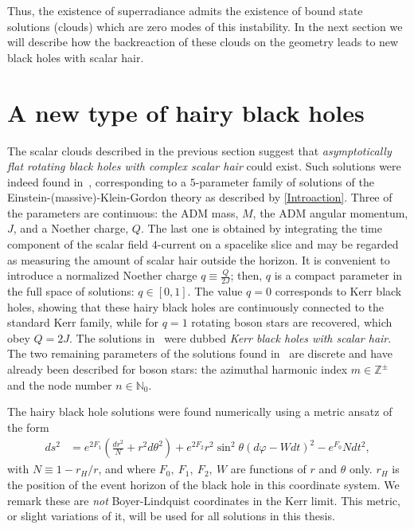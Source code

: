Thus, the existence of superradiance admits the existence of bound state solutions (clouds) which are zero modes of this instability.
In the next section we will describe how the backreaction of these clouds on the geometry leads to new black holes with scalar hair.

\section{A new type of hairy black holes}
\label{sec:HBHs}
The scalar clouds described in the previous section suggest that \textit{asymptotically flat rotating black holes with complex scalar hair} could exist.
Such solutions were indeed found in~\cite{Herdeiro:2014goa}, corresponding to a $5$-parameter family of solutions of the Einstein-(massive)-Klein-Gordon theory as described by \eqref{Introaction}.
Three of the parameters are continuous: the ADM mass, $M$, the ADM angular momentum, $J$, and a Noether charge, $Q$.
The last one is obtained by integrating the time component of the scalar field $4$-current on a spacelike slice and may be regarded as measuring the amount of scalar hair outside the horizon.
It is convenient to introduce a normalized Noether charge $q\equiv \frac{Q}{2J}$; then, $q$ is a compact parameter in the full space of solutions: $q\in\left[0,1\right]$.
The value $q=0$ corresponds to Kerr black holes, showing that these hairy black holes are continuously connected to the standard Kerr family, while for $q=1$ rotating boson stars are recovered, which obey $Q=2J$.
The solutions in~\cite{Herdeiro:2014goa} were dubbed \textit{Kerr black holes with scalar hair}.
The two remaining parameters of the solutions found in~\cite{Herdeiro:2014goa} are discrete and have already been described for boson stars: the azimuthal harmonic index $m\in \mathbb{Z}^\pm$ and the node number $n\in \mathbb{N}_0$. 

The hairy black hole solutions were found numerically using a metric ansatz of the form
\begin{align}
  ds^2 &= e^{2F_1}\left( \frac{dr^2}{N} + r^2d\theta^2 \right) + e^{2F_2}r^2\sin^2\theta \left( d\varphi - Wdt \right)^2 - e^{F_0}Ndt^2,
  \label{eqn:HBH-ansatz}
\end{align}
with $N\equiv 1-r_H/r$, and where $F_0,~F_1,~F_2,~W$ are functions of $r$ and $\theta$ only.
$r_H$ is the position of the event horizon of the black hole in this coordinate system.
We remark these are \textit{not} Boyer-Lindquist coordinates in the Kerr limit. 
This metric, or slight variations of it, will be used for all solutions in this thesis.

